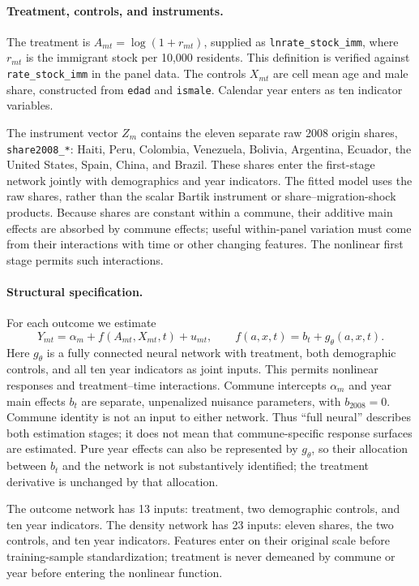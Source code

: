 \paragraph{Treatment, controls, and instruments.}
The treatment is $A_{mt}=\log(1+r_{mt})$, supplied as \texttt{lnrate\_stock\_imm}, where $r_{mt}$ is the immigrant stock per 10,000 residents. This definition is verified against \texttt{rate\_stock\_imm} in the panel data. The controls $X_{mt}$ are cell mean age and male share, constructed from \texttt{edad} and \texttt{ismale}. Calendar year enters as ten indicator variables.

The instrument vector $Z_m$ contains the eleven separate raw 2008 origin shares, \texttt{share2008\_*}: Haiti, Peru, Colombia, Venezuela, Bolivia, Argentina, Ecuador, the United States, Spain, China, and Brazil. These shares enter the first-stage network jointly with demographics and year indicators. The fitted model uses the raw shares, rather than the scalar Bartik instrument or share--migration-shock products. Because shares are constant within a commune, their additive main effects are absorbed by commune effects; useful within-panel variation must come from their interactions with time or other changing features. The nonlinear first stage permits such interactions.

\paragraph{Structural specification.}
For each outcome we estimate
\begin{equation}
Y_{mt}=\alpha_m+f(A_{mt},X_{mt},t)+u_{mt},\qquad
f(a,x,t)=b_t+g_\theta(a,x,t).
\label{eq:neural-panel}
\end{equation}
Here $g_\theta$ is a fully connected neural network with treatment, both demographic controls, and all ten year indicators as joint inputs. This permits nonlinear responses and treatment--time interactions. Commune intercepts $\alpha_m$ and year main effects $b_t$ are separate, unpenalized nuisance parameters, with $b_{2008}=0$. Commune identity is not an input to either network. Thus ``full neural'' describes both estimation stages; it does not mean that commune-specific response surfaces are estimated. Pure year effects can also be represented by $g_\theta$, so their allocation between $b_t$ and the network is not substantively identified; the treatment derivative is unchanged by that allocation.

The outcome network has 13 inputs: treatment, two demographic controls, and ten year indicators. The density network has 23 inputs: eleven shares, the two controls, and ten year indicators. Features enter on their original scale before training-sample standardization; treatment is never demeaned by commune or year before entering the nonlinear function.

